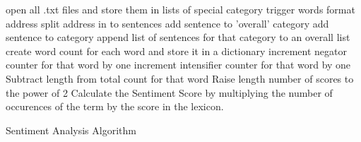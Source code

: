 \begin{singlespace}
\begin{algorithm}[H]
\DontPrintSemicolon
{}
\BlankLine
open all .txt files and store them in lists of special category trigger words\;
	{format address\;
	split address in to sentences\;
		{add sentence to 'overall' category\;
		{add sentence to category}
		{append list of sentences for that category to an overall list}
		{
			{create word count for each word and store it in a dictionary\;
				{increment negator counter for that word by one}
				{increment intensifier counter for that word by one}
			}
		{
		{
		{Subtract length from total count for that word}
		}
		{Raise length number of scores to the power of 2}
		Calculate the Sentiment Score by multiplying the number of occurences of the term by the score in the lexicon.
		}
		}
	}
	}
	
\caption{Sentiment Analysis Algorithm}
\label{alg:one}
\end{algorithm}
\end{singlespace}

